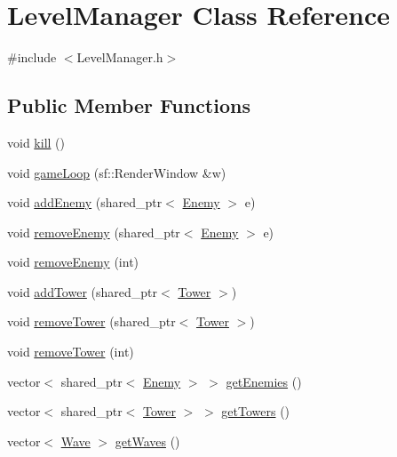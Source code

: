 \hypertarget{class_level_manager}{\section{Level\+Manager Class Reference}
\label{class_level_manager}
}


{\ttfamily \#include $<$Level\+Manager.\+h$>$}

\subsection*{Public Member Functions}
\begin{DoxyCompactItemize}
\item 
void \hyperlink{class_level_manager_a08e53dd6adc768f11fe228237f69812c}{kill} ()
\item 
void \hyperlink{class_level_manager_aa5fe71c398e90bbe0692bee8482565ff}{game\+Loop} (sf\+::\+Render\+Window \&w)
\item 
void \hyperlink{class_level_manager_a6e65b26fe458b839abc10edd582fae92}{add\+Enemy} (shared\+\_\+ptr$<$ \hyperlink{class_enemy}{Enemy} $>$ e)
\item 
void \hyperlink{class_level_manager_ab39faffd3cdf1b0db93e9a16309e165b}{remove\+Enemy} (shared\+\_\+ptr$<$ \hyperlink{class_enemy}{Enemy} $>$ e)
\item 
void \hyperlink{class_level_manager_ab30f1cdbbea36dd751a8d913c3ab032c}{remove\+Enemy} (int)
\item 
void \hyperlink{class_level_manager_aefa59f244e5ea86cc3f9d70943abfd16}{add\+Tower} (shared\+\_\+ptr$<$ \hyperlink{class_tower}{Tower} $>$)
\item 
void \hyperlink{class_level_manager_aa4824d853f1f46990bb751e7fdb76968}{remove\+Tower} (shared\+\_\+ptr$<$ \hyperlink{class_tower}{Tower} $>$)
\item 
void \hyperlink{class_level_manager_abc16dc36bc6303695e3b80475864b52b}{remove\+Tower} (int)
\item 
vector$<$ shared\+\_\+ptr$<$ \hyperlink{class_enemy}{Enemy} $>$ $>$ \hyperlink{class_level_manager_adbec76ac05350f5ad5225947893a198f}{get\+Enemies} ()
\item 
vector$<$ shared\+\_\+ptr$<$ \hyperlink{class_tower}{Tower} $>$ $>$ \hyperlink{class_level_manager_a3e72274151623dbe0ca48fb4c6ab5671}{get\+Towers} ()
\item 
vector$<$ \hyperlink{class_wave}{Wave} $>$ \hyperlink{class_level_manager_a0d63a324a0cd404302d64270099884f0}{get\+Waves} ()
\item 

\end{DoxyCompactItemize}
